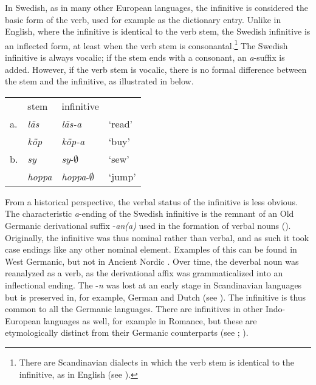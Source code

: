 \documentclass[output=paper]{langscibook}
\begin{document}
In Swedish, as in many other European languages, the infinitive is considered the basic form of the verb, used for example as the dictionary entry. Unlike in English, where the infinitive is identical to the verb stem, the Swedish infinitive is an inflected form, at least when the verb stem is consonantal.\footnote{There are Scandinavian dialects in which the verb stem is identical to the infinitive, as in English (see \citealt{Delsing2014Verbsystemet}).}  The Swedish infinitive is always vocalic; if the stem ends with a consonant, an \textit{a}{}-suffix is added. However, if the verb stem is vocalic, there is no formal difference between the stem and the infinitive, as illustrated in  below. 


\ea\label{ex:kalm:2}
\begin{tabular}[t]{llll}
{} & stem & infinitive & {}\\
a. & \textit{läs} & \textit{läs-a} & ‘read’\\
{} & \textit{köp} & \textit{köp-a} & ‘buy’\\	
b. & \textit{sy} & \textit{sy}{}-${\emptyset}$ & ‘sew’\\
{} & \textit{hoppa} & \textit{hoppa}{}-${\emptyset}$ & ‘jump’\\
\end{tabular}
\z

From a historical perspective, the verbal status of the infinitive is less obvious. The characteristic \textit{a}{}-ending of the Swedish infinitive is the remnant of an Old Germanic derivational suffix -\textit{an(a)} used in the formation of verbal nouns (\citealt[193]{FalkTorp1900}). Originally, the infinitive was thus nominal rather than verbal, and as such it took case endings like any other nominal element. Examples of this can be found in West Germanic, but not in Ancient Nordic \citep[205]{Prokosch1939}. Over time, the deverbal noun was reanalyzed as a verb, as the derivational affix was grammaticalized into an inflectional ending. The -\textit{n} was lost at an early stage in Scandinavian languages but is preserved in, for example, German and Dutch (see \citealt[636]{Noreen1898}). The infinitive is thus common to all the Germanic languages. There are infinitives in other Indo-European languages as well, for example in Romance, but these are etymologically distinct from their Germanic counterparts (see \citealt[205]{Prokosch1939}; \citealt[193]{FalkTorp1900}).
\end{document}
